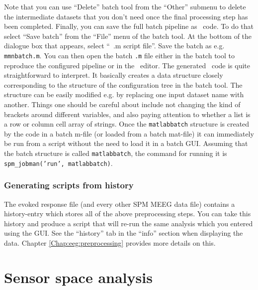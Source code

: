 Note that you can use ``Delete'' batch tool from the ``Other'' submenu to delete the intermediate datasets that you don't need once the final processing step has been completed. Finally, you can save the full batch pipeline as \matlab\ code. To do that select ``Save batch'' from the ``File'' menu of the batch tool. At the bottom of the dialogue box that appears, select ``\matlab\ .m script file''. Save the batch as e.g. \texttt{mmnbatch.m}. You can then open the batch \texttt{.m} file either in the batch tool to reproduce the configured pipeline or in the \matlab\ editor. The generated \matlab\ code is quite straightforward to interpret. It basically creates a data structure closely corresponding to the structure of the configuration tree in the batch tool. The structure can be easily modified e.g. by replacing one input dataset name with another. Things one should be careful about include not changing the kind of brackets around different variables, and also paying attention to whether a list is a row or column cell array of strings. Once the \texttt{matlabbatch} structure is created by the code in a batch m-file (or loaded from a batch mat-file) it can immediately be run from a script without the need to load it in a batch GUI. Assuming that the batch structure is called \texttt{matlabbatch}, the command for running it is \texttt{spm\_jobman('run', matlabbatch)}.

\subsubsection{Generating scripts from history}
The evoked response file (and every other SPM MEEG data file) contains a history-entry which stores all of the above preprocessing steps. You can take this history and produce a script that will re-run the same analysis which you entered using the GUI. See the ``history'' tab in the ``info'' section when displaying the data. Chapter \ref{Chap:eeg:preprocessing} provides more details on this.

\section{Sensor space analysis}

